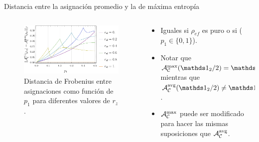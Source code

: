 \begin{frame}{Distancia entre la asignación promedio y la de máxima entropía}
    \begin{columns}
        \begin{column}{0.5\textwidth}
            \begin{figure}
                \centering
                \includegraphics[width=1.\linewidth]{figures/avg_results/dist_maxent_avg_vs_p.pdf}
                \caption{Distancia de Frobenius entre asignaciones como función de $p_{1}$ para diferentes valores de $r_{z}$.}
            \end{figure}
        \end{column}
        \pause
        \begin{column}{0.5\textwidth}
            \begin{itemize}
                \item Iguales si $\rho_{ef}$ es puro o si ($p_{1}\in\{0,1\}$).\pause
                \item Notar que $\mcA_{\mcC}^{\max}(\Id_{2}/2)=\Id_{4}/4$ mientras que $\mcA_{\mcC}^{\avg}(\Id_{2}/2)\neq\Id_{4}/4$.\pause
                \item $\mathcal{A}_{\mathcal{C}}^{\max}$ puede ser modificado para hacer las mismas suposiciones que $\mathcal{A}_{\mathcal{C}}^{\text{avg}}$.\pause
            \end{itemize}
        \end{column}
    \end{columns}
\end{frame}

